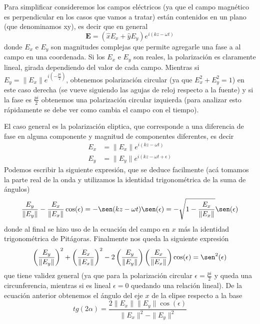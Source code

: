 \documentclass[a4paper]{article}
\numberwithin{equation}{section}
\begin{document}
	Para simplificar consideremos los campos eléctricos (ya que el campo magnético es perpendicular en los casos que vamos a tratar) están contenidos en un plano (que denominamos xy), es decir que en general \[ \textbf{E} = (\hat{x} E_x + \hat{y} E_y) e^{i(k z - \omega t)}\] donde $E_x$ e $E_y$ son magnitudes complejas que permite agregarle una fase a al campo en una coordenada. Si los $E_x$ e $E_y$ son reales, la polarización es claramente lineal, girada dependiendo del valor de cada campo. Mientras si $\displaystyle E_y = \|E_x\| e^{i \left(-\frac{pi}{2}\right)}$, obtenemos polarización circular (ya que $E_x^2 + E_y^2 = 1$) en este caso derecha (se vueve siguiendo las agujas de reloj respecto a la fuente) y si la fase es $\frac{pi}{2}$ obtenemos una polarización circular izquierda (para analizar esto rápidamente se debe ver como cambia el campo con el tiempo).
	
	El caso general es la polarización eliptica, que corresponde a una diferencia de fase en alguna componente y magnitud de componentes diferentes, es decir 
	\begin{align*}
		E_x &= \|E_x\| e^{i(k z - \omega t)}\\
		E_y &= \|E_y\| e^{i (k z - \omega t + \epsilon)}
	\end{align*}
	Podemos escribir la siguiente expresión, que se deduce facilmente (acá tomamos la parte real de la onda y utilizamos la identidad trigonométrica de la suma de ángulos) \[\frac{E_y}{\|E_y\|} - \frac{E_x}{\|E_x\|} \cos(\epsilon) = - \sen(k z - \omega t) \sen(\epsilon) = - \sqrt{1 - \frac{E_x}{\|E_x\|}} \sen(\epsilon)\]
	donde al final se hizo uso de la ecuación del campo en $x$ más la identidad trigonométrica de Pitágoras. Finalmente nos queda la siguiente expresión
	\begin{equation}
		\left(\frac{E_y}{\|E_y\|}\right)^2 + \left(\frac{E_x}{\|E_x\|}\right)^2 - 2 \left(\frac{E_y}{\|E_y\|}\right) \left(\frac{E_x}{\|E_x\|}\right) \cos(\epsilon) = \sen^2(\epsilon)
		\label{eq:polarizacion_elipitica}
	\end{equation}
	que tiene validez general (ya que para la polarización circular $\epsilon = \frac{pi}{2}$ y queda una circunferencia, mientras si es lineal $\epsilon = 0$ quedando una relación lineal). De la ecuación anterior obtenemos el ángulo del eje $x$ de la elipse respecto a la base 
	\begin{equation}
		tg(2\alpha) = \frac{2 \|E_x\| \|E_y\| \cos(\epsilon)}{\|E_x\|^2 - \|E_y\|^2}
		\label{eq:polarizacion_eliptica_angulo}
	\end{equation}
	
\end{document}
